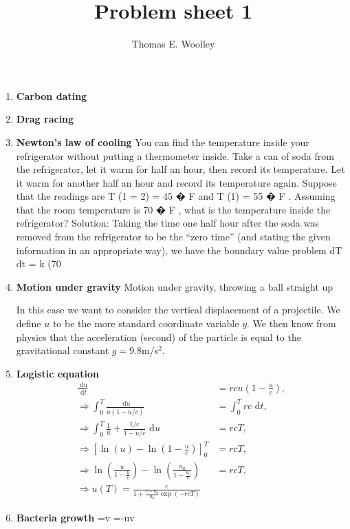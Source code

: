 \documentclass[]{article}
\title{Problem sheet 1}
\author{Thomas E. Woolley}
\newcommand{\rd}{\text{ d}}
\renewcommand{\l}{\left(}
\renewcommand{\r}{\right)}
\begin{document}
\maketitle
\begin{enumerate}
\item \textbf{Carbon dating}
\item \textbf{Drag racing}
\item \textbf{Newton's law of cooling}
You can find the temperature inside your refrigerator without putting
a thermometer inside. Take a can of soda from the refrigerator, let
it warm for half an hour, then record its temperature. Let it warm
for another half an hour and record its temperature again. Suppose
that the readings are
T
(1
=
2) = 45
�
F
and
T
(1) = 55
�
F
. Assuming
that the room temperature is
70
�
F
, what is the temperature inside the
refrigerator?
Solution:
Taking the time one half hour after the soda was removed from
the refrigerator to be the ``zero time'' (and stating the given information in
an appropriate way), we have the boundary value problem
dT
dt
=
k
(70




\item \textbf{Motion under gravity}
Motion under gravity, throwing a ball straight up 

In this case we want to consider the vertical displacement of a projectile. We define $u$ to be the more standard coordinate variable $y$. We then know from physics that the acceleration (second) of the particle is equal to the gravitational constant $g=9.8$m/s$^2$.

\item \textbf{Logistic equation}
\begin{align}
\frac{\rd u}{\rd t}&=rcu\l 1-\frac{u}{c}\r,\nonumber\\
\Rightarrow\int_0^T\frac{\rd u}{u(1-u/c)}&=\int_0^Trc \rd t,\nonumber\\
\Rightarrow\int_0^T \frac{1}{u}+\frac{1/c}{1-u/c}  \rd u&=rcT,\nonumber\\
\Rightarrow\left[\ln(u)-\ln\l 1- \frac{u}{c} \r \right]^T_0&=rcT,\nonumber\\
\Rightarrow\ln\l\frac{u}{1- \frac{u}{c}} \r-\ln\l\frac{u_0}{1- \frac{u_0}{c}} \r&=rcT,\nonumber\\
\Rightarrow u(T)=\frac{c}{1+\frac{c-u_0}{u_0}\exp\l{-rcT}\r}
\end{align}

\item \textbf{Bacteria growth}
=v
=-uv


\end{enumerate}
\end{document}
